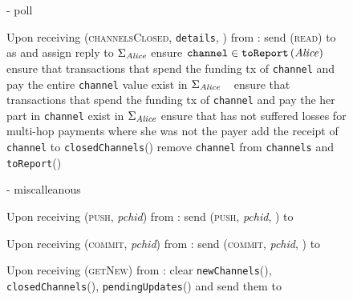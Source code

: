 \begin{figure}[H]
\begin{systembox}{\fpaynet - poll}
\begin{algorithmic}[1]
        \State Upon receiving (\textsc{channelsClosed}, \texttt{details},
        \alice) from \simulator:
        \Indent
          \State send (\textsc{read}) to \ledger{} as \alice{} and assign reply
          to $\Sigma_{\mathit{Alice}}$
            \State ensure $\mathtt{channel} \in
            \mathtt{toReport}\left(\mathit{Alice}\right)$
              \State ensure that transactions that spend the funding tx of
              \texttt{channel} and pay \alice{} the entire \texttt{channel}
              value exist in $\Sigma_{\mathit{Alice}}$
            \Else \ 
              \State ensure that transactions that spend the funding tx of
              \texttt{channel} and pay \alice{} the her part in \texttt{channel}
              exist in $\Sigma_{\mathit{Alice}}$
              \State ensure that \alice{} has not suffered losses for multi-hop
              payments where she was not the payer
            \EndIf
            \State add the receipt of \texttt{channel} to
            \texttt{closedChannels}(\alice)
            \State remove \texttt{channel} from \texttt{channels} and
            \texttt{toReport}(\alice)
          \EndFor
        \EndIndent
      \end{algorithmic}
    \end{systembox}
    \caption{}
    \label{alg:fpaynet:poll}
  \end{figure}

  \begin{figure}[H]
    \begin{systembox}{\fpaynet - miscalleanous}
      \begin{algorithmic}[1]
        \State Upon receiving (\textsc{push}, \textit{pchid}) from \alice:
        \Indent
          \State send (\textsc{push}, \textit{pchid}, \alice) to \simulator
        \EndIndent
        \Statex

        \State Upon receiving (\textsc{commit}, \textit{pchid}) from \alice:
        \Indent
          \State send (\textsc{commit}, \textit{pchid}, \alice) to \simulator
        \EndIndent
        \Statex

        \State Upon receiving (\textsc{getNew}) from \alice:
        \Indent
          \State clear \texttt{newChannels}(\alice),
          \texttt{closedChannels}(\alice), \texttt{pendingUpdates}(\alice) and
          send them to \alice
        \EndIndent
      \end{algorithmic}
    \end{systembox}
    \caption{}
    \label{alg:fpaynet:misc}
  \end{figure}
